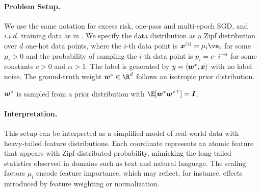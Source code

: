 \paragraph{Problem Setup.}
We use the same notation for excess risk, one-pass and multi-epoch SGD, and $i.i.d.$ training data as in .
We specify the data distribution as a Zipf distribution over $d$ one-hot data points, where the $i$-th data point is $\vx^{(i)} = \mu_i \ve_i$
for some $\mu_i > 0$
and the probability of sampling the $i$-th data point is $p_i = c \cdot i^{-\alpha}$ for some constants $c>0$ and $\alpha>1$.
The label is generated by $y = \left\langle {\bm{w}}^*,{\bm{x}}\right\rangle$ with no label noise.
The ground-truth weight $\vw^*\in\R^d$ follows an isotropic prior distribution.
\begin{assumption} \label{asp:parameter-prior}
    ${\bm{w}}^*$ is sampled from a prior distribution with 
    $\E[\vw^*\vw^{*\top}] = \mI$.
\end{assumption}

\paragraph{Interpretation.} 
This setup can be interpreted as a simplified model of real-world data with heavy-tailed feature distributions. Each coordinate represents an atomic feature that appears with Zipf-distributed probability, mimicking the long-tailed statistics observed in domains such as text and natural language. The scaling factors $\mu_i$ encode feature importance, which may reflect, for instance, effects introduced by feature weighting or normalization.



